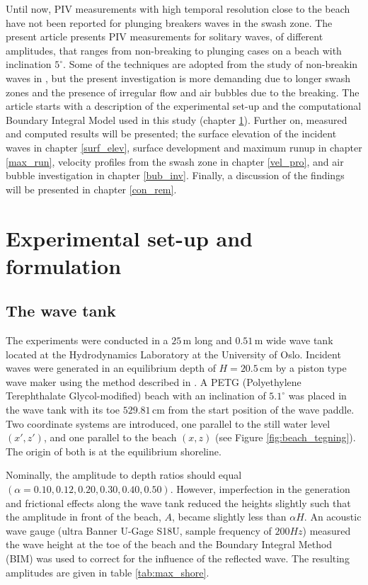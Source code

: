 \documentclass[review, authoryear]{elsarticle}
\newcommand{\cm}{\,\mbox{cm}}
\newcommand{\m}{\,\mbox{m}}
\begin{document}
Until now, PIV measurements with high temporal resolution close to the beach 
have not been reported for plunging breakers waves in the swash zone. 
The present article 
presents PIV measurements for solitary waves, of different amplitudes, that 
ranges from non-breaking to plunging cases on a beach with inclination $5^\circ$. Some of the techniques are adopted  from the study of non-breakin waves in \cite{pedersen2013runup}, but the present investigation is more demanding
due to longer swash zones and the presence of irregular flow and air bubbles due to the breaking. 
  The article starts with a description of the experimental set-up
 and the computational Boundary Integral Model used in this study (chapter \ref{experimnetal-set-up}). Further on,  measured and computed results will be presented; the surface elevation of the incident waves in chapter \ref{surf_elev}, surface development and maximum runup in chapter \ref{max_run}, velocity profiles from the swash zone in chapter \ref{vel_pro}, and air bubble investigation in chapter \ref{bub_inv}. Finally, a discussion of the findings will be presented in chapter \ref{con_rem}.

\section{Experimental set-up and formulation}
\label{experimnetal-set-up}

\subsection{The wave tank}
\label{wavetank}

The experiments were conducted in  a $25\m$ long and $0.51\m$ wide wave tank 
located at the Hydrodynamics Laboratory at the University of Oslo.
Incident waves were generated in an equilibrium depth of $H=20.5\cm$ by
a piston type wave maker using the method described in 
\cite{jensen2003experimental}. 
A PETG (Polyethylene Terephthalate Glycol-modified) beach with an inclination of $5.1^{\circ}$ was placed in the wave tank with its toe $529.81\cm$ from the start position of the wave paddle. Two coordinate systems are introduced, one parallel to the still water level $(x',z')$, and one parallel to the beach $(x,z)$ (see Figure \ref{fig:beach_tegning}).  The origin of both is at the equilibrium shoreline.

Nominally, the amplitude to depth ratios should equal $(\alpha=0.10,0.12,0.20,0.30,0.40,0.50)$.  
However, imperfection in the generation and frictional effects along
the wave tank reduced the heights slightly such that the amplitude in front of the
beach, $A$, became slightly less than $\alpha H$.  
An acoustic wave gauge (ultra Banner U-Gage S18U, sample frequency of $200Hz$) measured the wave height at the toe of the beach and the Boundary Integral Method (BIM) was used to correct for  the influence of the reflected wave.
The resulting amplitudes are given in table \ref{tab:max_shore}.
\end{document}
